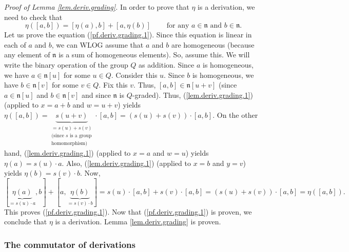 \documentclass[etingof-lie.tex]{subfiles}
\begin{document}
\textit{Proof of Lemma \ref{lem.deriv.grading}.} In order to prove that $\eta$
is a derivation, we need to check that
\begin{equation}
\eta\left(  \left[  a,b\right]  \right)  =\left[  \eta\left(  a\right)
,b\right]  +\left[  a,\eta\left(  b\right)  \right]
\ \ \ \ \ \ \ \ \ \ \text{for any }a\in\mathfrak{n}\text{ and }b\in
\mathfrak{n}. \label{pf.deriv.grading.1}%
\end{equation}
Let us prove the equation (\ref{pf.deriv.grading.1}). Since this equation is
linear in each of $a$ and $b$, we can WLOG assume that $a$ and $b$ are
homogeneous (because any element of $\mathfrak{n}$ is a sum of homogeneous
elements). So, assume this. We will write the binary operation of the group
$Q$ as addition. Since $a$ is homogeneous, we have $a\in\mathfrak{n}\left[
u\right]  $ for some $u\in Q$. Consider this $u$. Since $b$ is homogeneous, we
have $b\in\mathfrak{n}\left[  v\right]  $ for some $v\in Q$. Fix this $v$.
Thus, $\left[  a,b\right]  \in\mathfrak{n}\left[  u+v\right]  $ (since
$a\in\mathfrak{n}\left[  u\right]  $ and $b\in\mathfrak{n}\left[  v\right]  $
and since $\mathfrak{n}$ is $Q$-graded). Thus, (\ref{lem.deriv.grading.1})
(applied to $x=a+b$ and $w=u+v$) yields $\eta\left(  \left[  a,b\right]
\right)  =\underbrace{s\left(  u+v\right)  }_{\substack{=s\left(  u\right)
+s\left(  v\right)  \\\text{(since }s\text{ is a group}\\\text{homomorphism)}%
}}\cdot\left[  a,b\right]  =\left(  s\left(  u\right)  +s\left(  v\right)
\right)  \cdot\left[  a,b\right]  $. On the other hand,
(\ref{lem.deriv.grading.1}) (applied to $x=a$ and $w=u$) yields $\eta\left(
a\right)  =s\left(  u\right)  \cdot a$. Also, (\ref{lem.deriv.grading.1})
(applied to $x=b$ and $y=v$) yields $\eta\left(  b\right)  =s\left(  v\right)
\cdot b$. Now,%
\[
\left[  \underbrace{\eta\left(  a\right)  }_{=s\left(  u\right)  \cdot
a},b\right]  +\left[  a,\underbrace{\eta\left(  b\right)  }_{=s\left(
v\right)  \cdot b}\right]  =s\left(  u\right)  \cdot\left[  a,b\right]
+s\left(  v\right)  \cdot\left[  a,b\right]  =\left(  s\left(  u\right)
+s\left(  v\right)  \right)  \cdot\left[  a,b\right]  =\eta\left(  \left[
a,b\right]  \right)  .
\]
This proves (\ref{pf.deriv.grading.1}). Now that (\ref{pf.deriv.grading.1}) is
proven, we conclude that $\eta$ is a derivation. Lemma \ref{lem.deriv.grading}
is proven.

\subsubsection{The commutator of derivations}
\end{document}
